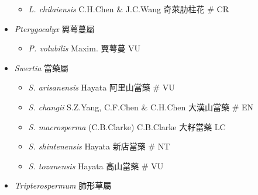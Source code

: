 \begin{itemize}
  \begin{itemize}
        \item[] \textit{L. chilaiensis} C.H.Chen \& J.C.Wang  奇萊肋柱花  \# CR
  \end{itemize}
 \item[] \textit{Pterygocalyx} 翼萼蔓屬
                                
  \begin{itemize}
        \item[] \textit{P. volubilis} Maxim.  翼萼蔓   VU
  \end{itemize}
 \item[] \textit{Swertia} 當藥屬
                                
  \begin{itemize}
        \item[] \textit{S. arisanensis} Hayata  阿里山當藥  \# VU
        \item[] \textit{S. changii} S.Z.Yang, C.F.Chen \& C.H.Chen  大漢山當藥  \# EN
        \item[] \textit{S. macrosperma} (C.B.Clarke) C.B.Clarke  大籽當藥   LC
        \item[] \textit{S. shintenensis} Hayata  新店當藥  \# NT
        \item[] \textit{S. tozanensis} Hayata  高山當藥  \# VU
  \end{itemize}
 \item[] \textit{Tripterospermum} 肺形草屬
                                

\end{itemize}
